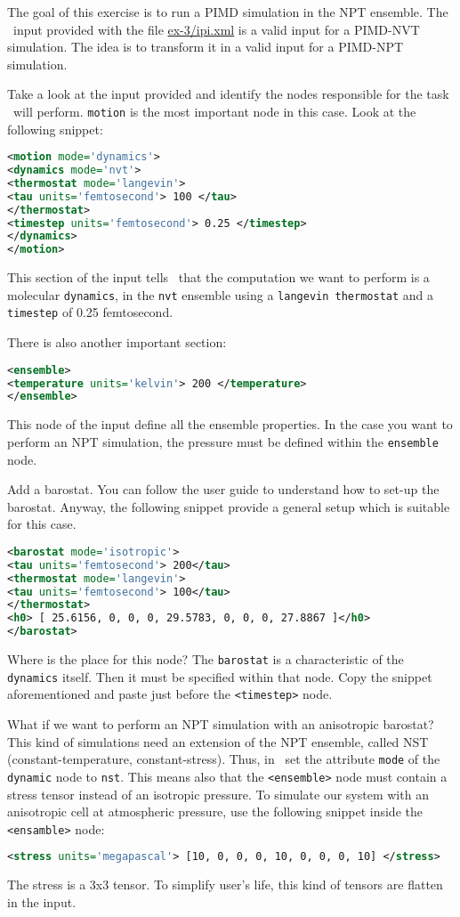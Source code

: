 \documentclass{article}
\begin{document}
\begin{Exercise}[label={inputs},title={PIMD-NPT simulation of ice}]
The goal of this exercise is to run a PIMD simulation in the NPT
ensemble. The \ipi\ input provided with the file \url{ex-3/ipi.xml} is
a valid input for a PIMD-NVT simulation. The idea is to transform it
in a valid input for a PIMD-NPT simulation.

\Question
Take a look at the input provided and identify the nodes responsible
for the task \ipi\ will perform.
\texttt{motion} is the most important node in this case.
Look at the following snippet:
\begin{lstlisting}[language=xml]
<motion mode='dynamics'>
<dynamics mode='nvt'>
<thermostat mode='langevin'>
<tau units='femtosecond'> 100 </tau>
</thermostat>
<timestep units='femtosecond'> 0.25 </timestep>
</dynamics>
</motion>
\end{lstlisting}
This section of the input tells \ipi\ that the computation we want to
perform is a molecular \texttt{dynamics}, in the \texttt{nvt} ensemble
using a \texttt{langevin thermostat} and a \texttt{timestep} of 0.25
femtosecond.

There is also another important section:
\begin{lstlisting}[language=xml]
<ensemble>
<temperature units='kelvin'> 200 </temperature>
</ensemble>
\end{lstlisting}
This node of the input define all the ensemble properties. In the
case you want to perform an NPT simulation, the pressure must be
defined within the \texttt{ensemble} node.


\Question
Add a barostat. You can follow the user guide to understand how to
set-up the barostat. Anyway, the following snippet provide a general setup
which is suitable for this case.
\begin{lstlisting}[language=xml]
<barostat mode='isotropic'>
<tau units='femtosecond'> 200</tau>
<thermostat mode='langevin'>
<tau units='femtosecond'> 100</tau>
</thermostat>
<h0> [ 25.6156, 0, 0, 0, 29.5783, 0, 0, 0, 27.8867 ]</h0>
</barostat>
\end{lstlisting}
Where is the place for this node? The \texttt{barostat} is a
characteristic of the \texttt{dynamics} itself. Then it must be
specified within that node. Copy the snippet aforementioned and paste
just before the \texttt{<timestep>} node.


\Question What if we want to perform an NPT simulation with an
anisotropic barostat? This kind of simulations need an extension of
the NPT ensemble, called NST (constant-temperature,
constant-stress). Thus, in \ipi\ set the attribute \texttt{mode} of
the \texttt{dynamic} node to \texttt{nst}. This means also that the
\texttt{<ensemble>} node must contain a stress tensor instead of an
isotropic pressure. To simulate our system with an anisotropic cell at
atmospheric pressure, use the following snippet inside the
\texttt{<ensamble>} node:
\begin{lstlisting}[language=xml]
<stress units='megapascal'> [10, 0, 0, 0, 10, 0, 0, 0, 10] </stress>
\end{lstlisting}
The stress is a 3x3 tensor. To simplify user's life, this kind of tensors are 
flatten in the \ipi input.


\end{Exercise}
\end{document}

